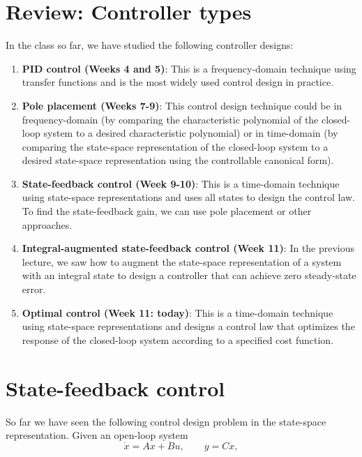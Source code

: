 \documentclass{ee122_notes}
\begin{document}
\section{Review: Controller types}
In the class so far, we have studied the following controller designs:
\begin{enumerate}
    \item \textbf{PID control (Weeks 4 and 5)}: This is a frequency-domain technique using transfer functions and is the most widely used control design in practice.
    \item \textbf{Pole placement (Weeks 7-9)}: This control design technique could be in frequency-domain (by comparing the characteristic polynomial of the closed-loop system to a desired characteristic polynomial) or in time-domain (by comparing the state-space representation of the closed-loop system to a desired state-space representation using the controllable canonical form). 
    \item \textbf{State-feedback control (Week 9-10)}: This is a time-domain technique using state-space representations and uses all states to design the control law. To find the state-feedback gain, we can use pole placement or other approaches.
    \item \textbf{Integral-augmented state-feedback control (Week 11)}: In the previous lecture, we saw how to augment the state-space representation of a system with an integral state to design a controller that can achieve zero steady-state error.
    \item \textbf{Optimal control (Week 11: today)}: This is a time-domain technique using state-space representations and designs a control law that optimizes the response of the closed-loop system according to a specified cost function.
\end{enumerate}
\section{State-feedback control}
So far we have seen the following control design problem in the state-space representation. Given an open-loop system 
\begin{equation}
    \dot{x} = Ax + Bu, \qquad y = Cx,
    \label{eq:open_loop}
\end{equation}
\end{document}
